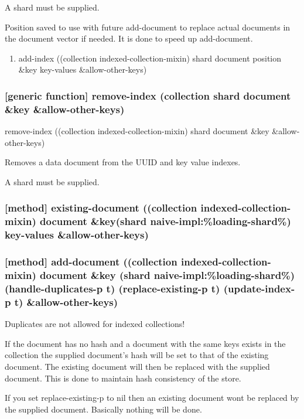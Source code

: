 \documentclass[11pt]{article}
\begin{document}
A shard must be supplied.

Position saved to use with future add-document to replace actual
documents in the document vector if needed. It is done to speed up
add-document.

\begin{enumerate}
\item add-index ((collection indexed-collection-mixin) shard document position \&key key-values \&allow-other-keys)
\label{sec:org3483307}
\end{enumerate}


\subsubsection{[generic function] remove-index (collection shard document \&key \&allow-other-keys)}
\label{sec:org1d67d7c}

remove-index ((collection indexed-collection-mixin) shard document \&key \&allow-other-keys)

Removes a data document from the UUID and key value indexes.

A shard must be supplied.

\subsubsection{[method] existing-document ((collection indexed-collection-mixin) document \&key(shard naive-impl:\%loading-shard\%)  key-values \&allow-other-keys)}
\label{sec:orgf7eb816}

\subsubsection{[method] add-document ((collection indexed-collection-mixin) document \&key (shard naive-impl:\%loading-shard\%) (handle-duplicates-p t) (replace-existing-p t) (update-index-p t) \&allow-other-keys)}
\label{sec:org825a84e}

Duplicates are not allowed for indexed collections!

If the document has no hash and a document with the same keys exists
in the collection the supplied document's hash will be set to that of
the existing document. The existing document will then be replaced
with the supplied document. This is done to maintain hash consistency
of the store.

If you set replace-existing-p to nil then an existing document wont be
replaced by the supplied document. Basically nothing will be done.
\end{document}
